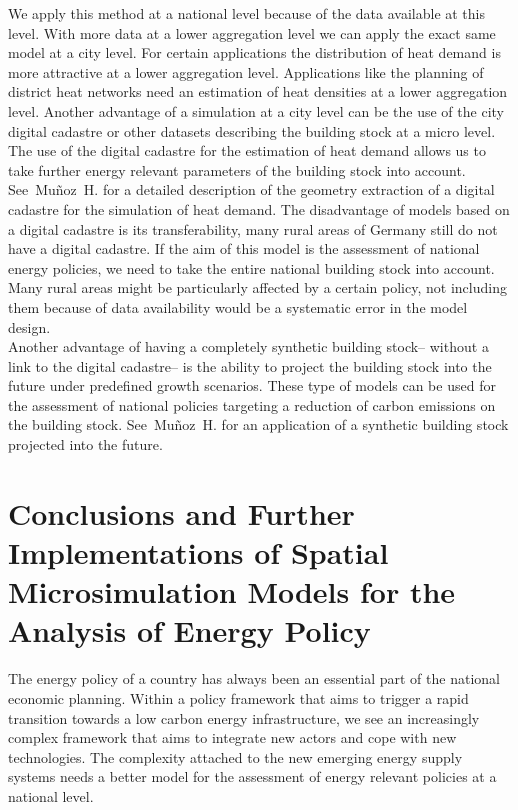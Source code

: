 \documentclass[runningheads,a4paper]{llncs}
\begin{document}
We apply this method at a national level because of the data available at this
level. With more data at a lower aggregation level we can apply the exact same
model at a city level. For certain applications the distribution of heat demand
is more attractive at a lower aggregation level. Applications like the planning
of district heat networks need an estimation of heat densities at a lower aggregation level.
Another advantage of a simulation at a city level can be the use of the city
digital cadastre or other datasets describing the building stock at a micro
level. The use of the digital cadastre for the estimation of heat demand allows
us to take further energy relevant parameters of the building stock into
account. See~Mu\~noz~H.\cite{MunozH.2015.MEQ} for a detailed description of the geometry
extraction of a digital cadastre for the simulation of heat demand. The
disadvantage of models based on a digital cadastre is its transferability, many
rural areas of Germany still do not have a digital cadastre. If the aim of this
model is the assessment of national energy policies, we need to take the
entire national building stock into account. Many rural areas might be
particularly affected by a certain policy, not including them because of data
availability would be a systematic error in the model design.
\\

Another advantage of having a completely synthetic building stock-- without a
link to the digital cadastre-- is the ability to project the building stock
into the future under predefined growth scenarios. These type of models can be
used for the assessment of national policies targeting a reduction of carbon
emissions on the building stock. See~Mu\~noz~H.\cite{MunozH.2015.IBPSA.Pop} for an
application of a synthetic building stock projected into the future.
\\


\section{Conclusions and Further Implementations of Spatial Microsimulation Models for the Analysis of Energy Policy}
\label{sec:conclusions}

The energy policy of a country has always been an essential part of the
national economic planning. Within a policy framework that aims to trigger a
rapid transition towards a low carbon energy infrastructure, we see an
increasingly complex framework that aims to integrate new actors and cope with
new technologies. The complexity attached to the new emerging energy supply systems
needs a better model for the assessment of energy relevant policies at a
national level.
\\
\end{document}
